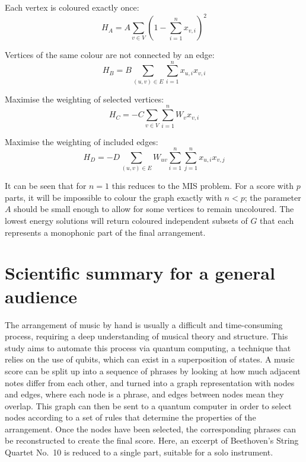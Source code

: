 \documentclass[12pt]{article}
\theoremstyle{definition}
\begin{document}
Each vertex is coloured exactly once:
\begin{equation*}
    H_A = A\sum_{v \in V}\left(1-\sum_{i=1}^{n} x_{v,i}\right)^2
\end{equation*}

Vertices of the same colour are not connected by an edge:
\begin{equation*}
    H_B = B\sum_{(u,v) \in E}\sum_{i=1}^n x_{u,i}x_{v,i}
\end{equation*}

Maximise the weighting of selected vertices:
\begin{equation*}
    H_C = -C\sum_{v \in V}\sum_{i=1}^n W_vx_{v,i}
\end{equation*}

Maximise the weighting of included edges:
\begin{equation*}
    H_D = -D\sum_{(u,v)\in E}W_{uv}\sum_{i=1}^n\sum_{j=1}^n x_{u,i}x_{v,j}
\end{equation*}

It can be seen that for $n=1$ this reduces to the MIS problem. For a score with $p$ parts, it will be impossible to colour the graph exactly with $n<p$; the parameter $A$ should be small enough to allow for some vertices to remain uncoloured. The lowest energy solutions will return coloured independent subsets of $G$ that each represents a monophonic part of the final arrangement.

\clearpage

\section*{Scientific summary for a general audience} %

The arrangement of music by hand is usually a difficult and time-consuming process, requiring a deep understanding of musical theory and structure. This study aims to automate this process via quantum computing, a technique that relies on the use of qubits, which can exist in a superposition of states. A music score can be split up into a sequence of phrases by looking at how much adjacent notes differ from each other, and turned into a graph representation with nodes and edges, where each node is a phrase, and edges between nodes mean they overlap. This graph can then be sent to a quantum computer in order to select nodes according to a set of rules that determine the properties of the arrangement. Once the nodes have been selected, the corresponding phrases can be reconstructed to create the final score. Here, an excerpt of Beethoven's String Quartet No.\ 10 is reduced to a single part, suitable for a solo instrument.
\end{document}
